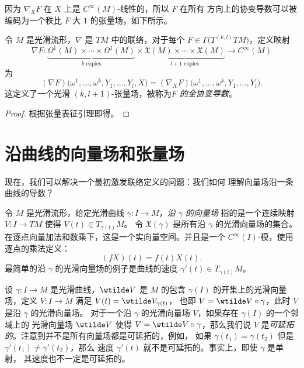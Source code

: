 \documentclass[fontset=none]{Notes}
\begin{document}
因为 $\nabla_XF$ 在 $X$ 上是 $C^\infty(M)$-线性的，所以 $F$ 在所有
方向上的协变导数可以被编码为一个秩比 $F$ 大 $1$ 的张量场，如下所示。

\begin{proposition}[全协变导数]
  令 $M$ 是光滑流形，$\nabla$ 是 $TM$ 中的联络，对于每个
  $F\in\Gamma\bigl(T^{(k,l)}TM\bigr)$，定义映射
  \[
    \nabla F:\underbrace{\Omega^1(M)\times\cdots\times\Omega^1(M)}_{\text{$k$ copies}}
    \times \underbrace{\mathfrak{X}(M)\times\cdots\times \mathfrak{X}(M)}_{\text{$l+1$ copies}}
    \to C^\infty(M)
  \]
  为
  \begin{equation}
    (\nabla F)\bigl(\omega^1,\dots,\omega^k,Y_1,\dots,Y_l,X\bigr)
    =(\nabla_XF)\bigl(\omega^1,\dots,\omega^k,Y_1,\dots,Y_l\bigr).
  \end{equation}
  这定义了一个光滑 $(k,l+1)$-张量场，被称为\emph{$F$ 的全协变导数}。
\end{proposition}
\begin{proof}
  根据张量表征引理即得。
\end{proof}






\section{沿曲线的向量场和张量场}

现在，我们可以解决一个最初激发联络定义的问题：我们如何
理解向量场沿一条曲线的导数？

令 $M$ 是光滑流形，给定光滑曲线 $\gamma:I\to M$，\emph{沿 $\gamma$ 的向量场}
指的是一个连续映射 $V:I\to TM$ 使得 $V(t)\in T_{\gamma(t)}M$。
令 $\mathfrak{X}(\gamma)$ 是所有沿 $\gamma$ 的光滑向量场的集合。
在逐点向量加法和数乘下，这是一个实向量空间。并且是一个
$C^\infty(I)$-模，使用逐点的乘法定义：
\[
  (fX)(t)=f(t)X(t).  
\]
最简单的沿 $\gamma$ 的光滑向量场的例子是曲线的速度
$\gamma'(t)\in T_{\gamma(t)}M$。

设 $\gamma:I\to M$ 是光滑曲线，$\wtilde V$ 是 $M$ 的包含 $\gamma(I)$
的开集上的光滑向量场，定义 $V:I\to M$ 满足 $V(t)= \wtilde V_{\gamma(t)}$，
也即 $V=\wtilde V\circ \gamma$，此时 $V$ 是沿 $\gamma$ 的光滑向量场。
对于一个沿 $\gamma$ 的光滑向量场 $V$，如果存在 $\gamma(I)$ 的一个邻域上的
光滑向量场 $\wtilde V$ 使得 $V=\wtilde V\circ\gamma$，那么我们说
$V$ 是\emph{可延拓的}。注意到并不是所有向量场都是可延拓的，例如，
如果 $\gamma(t_1)=\gamma(t_2)$ 但是 $\gamma'(t_1)\neq \gamma'(t_2)$，那么
速度 $\gamma'(t)$ 就不是可延拓的。事实上，即使 $\gamma$ 是单射，
其速度也不一定是可延拓的。
\end{document}
